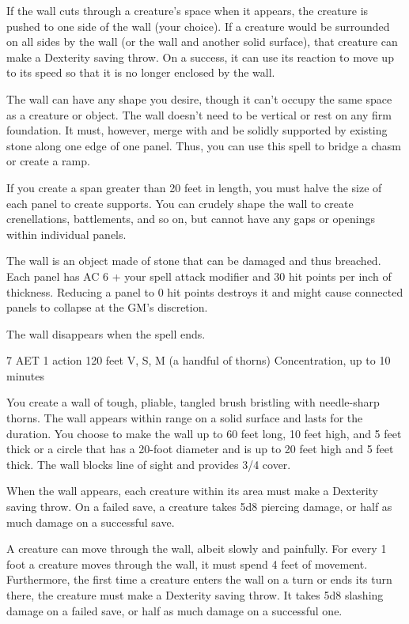 If the wall cuts through a creature's space when it appears, the creature is pushed to one side of the wall (your choice). If a creature would be surrounded on all sides by the wall (or the wall and another solid surface), that creature can make a Dexterity saving throw. On a success, it can use its reaction to move up to its speed so that it is no longer enclosed by the wall.

The wall can have any shape you desire, though it can't occupy the same space as a creature or object. The wall doesn't need to be vertical or rest on any firm foundation. It must, however, merge with and be solidly supported by existing stone along one edge of one panel. Thus, you can use this spell to bridge a chasm or create a ramp.

If you create a span greater than 20 feet in length, you must halve the size of each panel to create supports. You can crudely shape the wall to create crenellations, battlements, and so on, but cannot have any gaps or openings within individual panels.

The wall is an object made of stone that can be damaged and thus breached. Each panel has AC 6 + your spell attack modifier and 30 hit points per inch of thickness. Reducing a panel to 0 hit points destroys it and might cause connected panels to collapse at the GM's discretion.

The wall disappears when the spell ends.


{7 AET}
{1 action}
{120 feet}
{V, S, M (a handful of thorns)}
{Concentration, up to 10 minutes}

You create a wall of tough, pliable, tangled brush bristling with needle-sharp thorns. The wall appears within range on a solid surface and lasts for the duration. You choose to make the wall up to 60 feet long, 10 feet high, and 5 feet thick or a circle that has a 20-foot diameter and is up to 20 feet high and 5 feet thick. The wall blocks line of sight and provides 3/4 cover.

When the wall appears, each creature within its area must make a Dexterity saving throw. On a failed save, a creature takes 5d8 piercing damage, or half as much damage on a successful save.

A creature can move through the wall, albeit slowly and painfully. For every 1 foot a creature moves through the wall, it must spend 4 feet of movement. Furthermore, the first time a creature enters the wall on a turn or ends its turn there, the creature must make a Dexterity saving throw. It takes 5d8 slashing damage on a failed save, or half as much damage on a successful one.

